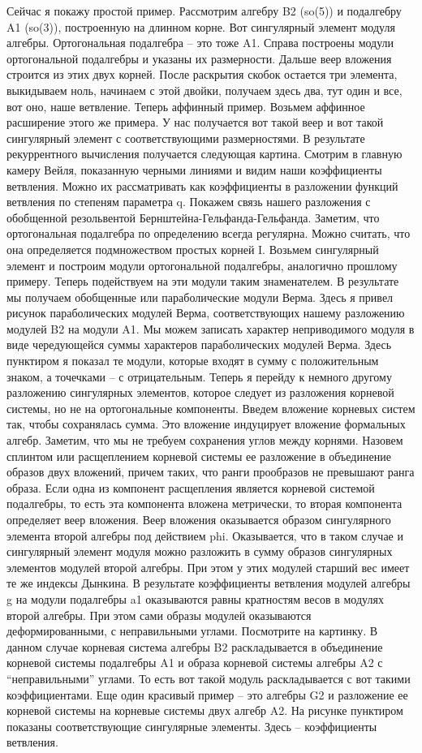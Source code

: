 \documentclass{article}
\theoremstyle{definition} \newtheorem{Def}{Определение}
\begin{document}
Сейчас я покажу простой пример. Рассмотрим алгебру B2 (so(5)) и подалгебру A1 (so(3)), построенную на длинном корне. Вот сингулярный элемент модуля алгебры. Ортогональная подалгебра -- это тоже A1. Справа построены модули ортогональной подалгебры и указаны их размерности.
Дальше веер вложения строится из этих двух корней. После раскрытия скобок остается три элемента, выкидываем ноль, начинаем с этой двойки, получаем здесь два, тут один и все, вот оно, наше ветвление. 
Теперь аффинный пример. Возьмем аффинное расширение этого же примера. У нас получается вот такой веер и вот такой сингулярный элемент с соответствующими размерностями. В результате рекуррентного вычисления получается следующая картина. Смотрим в главную камеру Вейля, показанную черными линиями и видим наши коэффициенты ветвления. Можно их рассматривать как коэффициенты в разложении функций ветвления по степеням параметра q. 
Покажем связь нашего разложения с обобщенной резольвентой Бернштейна-Гельфанда-Гельфанда. Заметим, что ортогональная подалгебра по определению всегда регулярна. Можно считать, что она определяется подмножеством простых корней I. Возьмем сингулярный элемент и построим модули ортогональной подалгебры, аналогично прошлому примеру. Теперь подействуем на эти модули таким знаменателем. В результате мы получаем обобщенные или параболические модули Верма. 
Здесь я привел рисунок параболических модулей Верма, соответствующих нашему разложению модулей B2 на модули A1. Мы можем записать характер неприводимого модуля в виде чередующейся суммы характеров параболических модулей Верма. Здесь пунктиром я показал те модули, которые входят в сумму с положительным знаком, а точечками -- с отрицательным. 
Теперь я перейду к немного другому разложению сингулярных элементов, которое следует из разложения корневой системы, но не на ортогональные компоненты. Введем вложение корневых систем так, чтобы сохранялась сумма. Это вложение индуцирует вложение формальных алгебр. Заметим, что мы не требуем сохранения углов между корнями. 
Назовем сплинтом или расщеплением корневой системы ее разложение в объединение образов двух вложений, причем таких, что ранги прообразов не превышают ранга образа. Если одна из компонент расщепления является корневой системой подалгебры, то есть эта компонента вложена метрически, то вторая компонента определяет веер вложения. Веер вложения оказывается образом сингулярного элемента второй алгебры под действием phi. 
Оказывается, что в таком случае и сингулярный элемент модуля можно разложить в сумму образов сингулярных элементов модулей второй алгебры. При этом у этих модулей старший вес имеет те же индексы Дынкина. В результате коэффициенты ветвления модулей алгебры g на модули подалгебры a1 оказываются равны кратностям весов в модулях второй алгебры. При этом сами образы модулей оказываются деформированными, с неправильными углами. Посмотрите на картинку. В данном случае корневая система алгебры B2 раскладывается в объединение корневой системы подалгебры A1 и образа корневой системы алгебры A2 с ``неправильными'' углами. То есть вот такой модуль раскладывается с вот такими коэффициентами. Еще один красивый пример -- это алгебры G2 и разложение ее корневой системы на корневые системы двух алгебр A2. На рисунке пунктиром показаны соответствующие сингулярные элементы. Здесь -- коэффициенты ветвления. 
\end{document}
